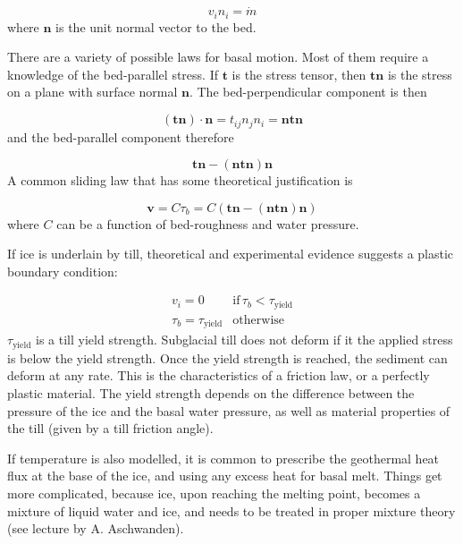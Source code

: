 \documentclass[12pt, openany]{memoir}
\begin{document}
\begin{equation}
v_i n_i = \dot{m}
\end{equation} 
where $\mathbf{n}$ is the unit normal vector to the bed. 

There are a variety of possible laws for basal motion. Most of them
require a knowledge of the bed-parallel stress. If $\mathbf{t}$ is the
stress tensor, then $\mathbf{t} \mathbf{n}$ is the stress on a plane
with surface normal $\mathbf{n}$. The bed-perpendicular component is
then 

\begin{equation}
(\mathbf{t} \mathbf{n}) \cdot \mathbf{n} = t_{ij}n_jn_i =  \mathbf{n}
  \mathbf{t} \mathbf{n}
\end{equation}
and the bed-parallel component therefore

\begin{equation}
\mathbf{t} \mathbf{n} - (\mathbf{n} \mathbf{t} \mathbf{n}) \mathbf{n}
\end{equation}
A common sliding law that has some theoretical justification is

\begin{equation}
\mathbf{v} = C \tau_b = C ( \mathbf{t} \mathbf{n} - (\mathbf{n}
  \mathbf{t} \mathbf{n}) \mathbf{n} )
\end{equation}
where $C$ can be a function of bed-roughness and water pressure.

If ice is underlain by till, theoretical and experimental evidence
suggests a plastic boundary condition:

\begin{eqnarray}
v_i = 0 &\mathrm{if} \, \tau_b < \tau_\mathrm{yield} \\
\tau_b = \tau_\mathrm{yield}  &\mathrm{otherwise}
\end{eqnarray}
$\tau_\mathrm{yield}$ is a till yield strength. Subglacial till does
not deform if it the applied stress is below the yield strength. Once
the yield strength is reached, the sediment can deform at any
rate. This is the characteristics of a friction law, or a perfectly
plastic material. The yield strength depends on the difference between
the pressure of the ice and the basal water pressure, as well as
material properties of the till (given by a till friction angle).

If temperature is also modelled, it is common to prescribe the
geothermal heat flux at the base of the ice, and using any excess heat
for basal melt. Things get more complicated, because ice, upon
reaching the melting point, becomes a mixture of liquid water and ice,
and needs to be treated in proper mixture theory (see lecture by
A. Aschwanden). 
\end{document}

